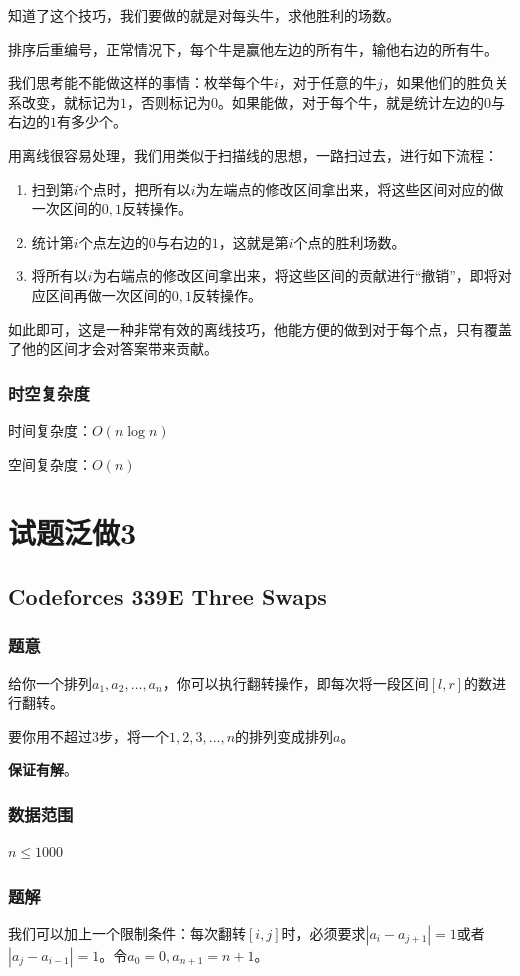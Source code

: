 \documentclass{ctexart}
\begin{document}
知道了这个技巧，我们要做的就是对每头牛，求他胜利的场数。

排序后重编号，正常情况下，每个牛是赢他左边的所有牛，输他右边的所有牛。

我们思考能不能做这样的事情：枚举每个牛$i$，对于任意的牛$j$，如果他们的胜负关系改变，就标记为$1$，否则标记为$0$。如果能做，对于每个牛，就是统计左边的$0$与右边的$1$有多少个。

用离线很容易处理，我们用类似于扫描线的思想，一路扫过去，进行如下流程：
\begin{enumerate}
\item 扫到第$i$个点时，把所有以$i$为左端点的修改区间拿出来，将这些区间对应的做一次区间的$0,1$反转操作。
\item 统计第$i$个点左边的$0$与右边的$1$，这就是第$i$个点的胜利场数。
\item 将所有以$i$为右端点的修改区间拿出来，将这些区间的贡献进行“撤销”，即将对应区间再做一次区间的$0,1$反转操作。
\end{enumerate}

如此即可，这是一种非常有效的离线技巧，他能方便的做到对于每个点，只有覆盖了他的区间才会对答案带来贡献。
\subsubsection{时空复杂度}
时间复杂度：$O(n \log n)$

空间复杂度：$O(n)$
\newpage
\section{试题泛做3}
\subsection{Codeforces 339E Three Swaps}
\subsubsection{题意}
给你一个排列$a_1,a_2,\ldots,a_n$，你可以执行翻转操作，即每次将一段区间$[l,r]$的数进行翻转。

要你用不超过$3$步，将一个$1,2,3,\ldots,n$的排列变成排列$a$。

\textbf{保证有解}。
\subsubsection{数据范围}
$n \le 1000$
\subsubsection{题解}
我们可以加上一个限制条件：每次翻转$[i,j]$时，必须要求$|a_i-a_{j+1}|=1$或者$|a_j-a_{i-1}|=1$。令$a_0=0,a_{n+1}=n+1$。
\end{document}
